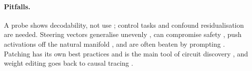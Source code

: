 \paragraph{Pitfalls.} A probe shows decodability, not use \citep{belinkov2021probing}; control tasks \citep{hewitt2019control} and confound residualisation \citep{sahoo2026format} are needed. Steering vectors generalise unevenly \citep{tan2024steering,dasilva2025steering}, can compromise safety \citep{korznikov2025rogue}, push activations off the natural manifold \citep{mishra2026nonsurjective}, and are often beaten by prompting \citep{wu2025axbench}. Patching has its own best practices \citep{zhang2023patching,heimersheim2024patching} and is the main tool of circuit discovery \citep{wang2022ioi}, and weight editing goes back to causal tracing \citep{meng2022rome}.
